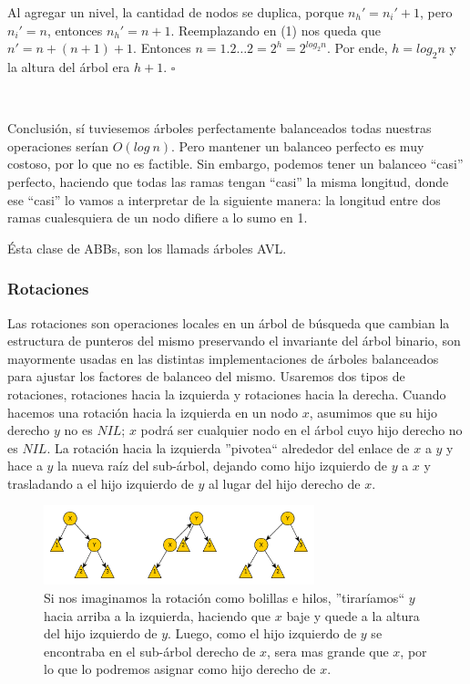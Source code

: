 Al agregar un nivel, la cantidad de nodos se duplica, porque $n_h' = n_i' + 1$, pero $n_i' = n$, entonces $n_h' = n +1$. Reemplazando en (1) nos queda que $n' = n + (n + 1) + 1$. Entonces $n = 1 $.$ 2 \dots 2 = 2^h = 2^{log_2 n}$.
Por ende, $h = log_2n$ y la altura del \'arbol era $h+1$. $\square$

~

Conclusi\'on, s\'i tuviesemos \'arboles perfectamente balanceados todas nuestras operaciones ser\'ian $O(log\ n)$. Pero mantener un balanceo perfecto es muy costoso, por lo que no es factible.
Sin embargo, podemos tener un balanceo ``casi'' perfecto, haciendo que todas las ramas tengan ``casi'' la misma longitud, donde ese ``casi'' lo vamos a interpretar de la siguiente manera: la longitud entre dos ramas cualesquiera de un nodo difiere a lo sumo en 1.

\'Esta clase de ABBs, son los llamads \'arboles AVL.

\subsubsection{Rotaciones}

Las rotaciones son operaciones locales en un \'arbol de b\'usqueda que cambian la estructura de punteros del mismo preservando el invariante del \'arbol binario, son mayormente usadas en las distintas implementaciones de \'arboles balanceados para ajustar los factores de balanceo del mismo. Usaremos dos tipos de rotaciones, rotaciones hacia la izquierda y rotaciones hacia la derecha. Cuando hacemos una rotaci\'on hacia la izquierda en un nodo $x$, asumimos que su hijo derecho $y$ no es $NIL$; $x$ podr\'a ser cualquier nodo en el \'arbol cuyo hijo derecho no es $NIL$. La rotaci\'on hacia la izquierda ''pivotea`` alrededor del enlace de $x$ a $y$ y hace a $y$ la nueva ra\'iz del sub-\'arbol, dejando como hijo izquierdo de $y$ a $x$ y trasladando a el hijo izquierdo de $y$ al lugar del hijo derecho de $x$. 

\begin{figure}
 \centering
 \includegraphics[width=0.7\textwidth]{graficos/RBRotacionIzq.pdf}
 \caption*{\newline \footnotesize Si nos imaginamos la rotaci\'on como bolillas e hilos, ''tirar\'iamos`` $y$ hacia arriba a la izquierda, haciendo que $x$ baje y quede a la altura del hijo izquierdo de $y$. Luego, como el hijo izquierdo de $y$ se encontraba en el sub-\'arbol derecho de $x$, sera mas grande que $x$, por lo que lo podremos asignar como hijo derecho de $x$.}
\end{figure}

